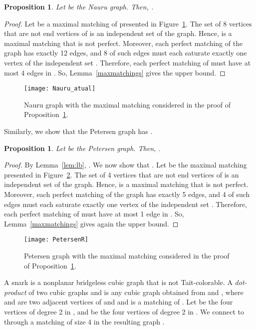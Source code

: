 \documentclass{article}
\newtheorem{proposition}[thm]{Proposition}
\begin{document}
\begin{proposition} \label{prop:bipartiteubNauru}
Let  be the Nauru graph. Then, .
\end{proposition}

\begin{proof}
Let  be a maximal matching of  presented in Figure~\ref{fig:nauru}. The set  of 8 vertices that are not end vertices of  is an independent set of the graph. Hence,  is a maximal matching that is not perfect. Moreover, each perfect matching of the graph has exactly 12 edges, and 8 of such edges must each saturate exactly one vertex of the independent set . Therefore, each perfect matching of  must have at most 4 edges in . So, Lemma~\ref{maxmatchings} gives the upper bound.
\end{proof}

\begin{figure}[ht]
\centering
\texttt{[image: Nauru\_atual]}
\caption{Nauru graph  with the maximal matching considered in the proof of Proposition~\ref{prop:bipartiteubNauru}.}
\label{fig:nauru}
\end{figure}

Similarly, we show that the Petersen graph  has .

\begin{proposition} \label{lem:petersenub}
Let  be the Petersen graph. Then, .
\end{proposition}
\begin{proof}
By Lemma~\ref{lem:lb}, . We now show that . Let  be the maximal matching presented in Figure~\ref{fig:petersen}. The set  of 4 vertices that are not end vertices of  is an independent set of the graph. Hence,  is a maximal matching that is not perfect. Moreover, each perfect matching of the graph has exactly 5 edges, and 4 of such edges must each saturate exactly one vertex of the independent set . Therefore, each perfect matching of  must have at most 1 edge in . So, Lemma~\ref{maxmatchings} gives again the upper bound.
\end{proof}

\begin{figure}[ht]
\centering
\texttt{[image: PetersenR]}
\caption{Petersen graph  with the maximal matching considered in the proof of Proposition~\ref{lem:petersenub}.} 
\label{fig:petersen}
\end{figure}

A snark is a nonplanar bridgeless cubic graph that is not Tait-colorable. A \emph{dot-product} of two cubic graphs  and  is any cubic graph obtained from  and , where  and  are two adjacent vertices of  and  and  is a matching of . Let  be the four vertices of degree 2 in , and  be the four vertices of degree 2 in . We connect  to  through a matching of size 4 in the resulting graph .
\end{document}
